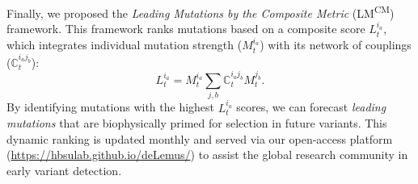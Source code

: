 \documentclass[%
 reprint,
superscriptaddress,
 amsmath,amssymb,
 aps,
]{revtex4-2}
\begin{document}
Finally, we proposed the \textit{Leading Mutations by the Composite Metric} (LM\textsuperscript{CM}) framework. This framework ranks mutations based on a composite score $L_t^{i_a}$, which integrates individual mutation strength ($M_t^{i_a}$) with its network of couplings ($\mathbb{C}_t^{i_{a}j_{b}}$):
\begin{equation}
    L_t^{i_a} = M_t^{i_a} \sum_{j,b}{\mathbb{C}_t^{i_{a}j_{b}} M_t^{j_b}}.
\end{equation}
By identifying mutations with the highest $L_t^{i_a}$ scores, we can forecast \textit{leading mutations} that are biophysically primed for selection in future variants. This dynamic ranking is updated monthly and served via our open-access platform (\href{https://hbsulab.github.io/deLemus/}{https://hbsulab.github.io/deLemus/}) to assist the global research community in early variant detection.


\end{document}

